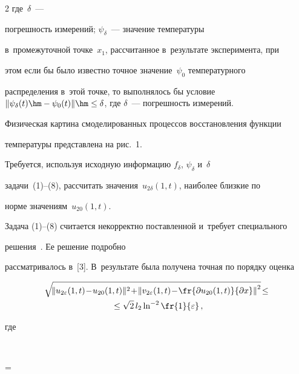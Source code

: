 \begin{multicols}{2}
где~$\delta$~--- 

погрешность измерений; $\psi_\delta$~--- значение температуры 

в~промежуточной точке~$x_1$, рассчитанное в~результате эксперимента, при 

этом если бы было известно точное значение~$\psi_0$ температурного 

распределения в~этой точке, то выполнялось бы условие $\| \psi_\delta(t)\hm- 

\psi_0(t)\| \hm\leq \delta$, где $\delta$~--- погрешность измерений.

  

  Физическая картина смоделированных процессов восстановления функции 

температуры пред\-став\-ле\-на на рис.~1.

  



  

  Требуется, используя исходную информацию $f_\delta$, $\psi_\delta$ и~$\delta$ 

задачи~(1)--(8), рассчитать значения~$u_{2\delta}(1,t)$, наиболее близкие по 

норме значениям~$u_{20}(1,t)$.

  

  Задача (1)--(8) считается некорректно по\-став\-лен\-ной и~требует специального 

решения~\cite{2-sr, 11-sr, 12-sr, 13-sr, 14-sr}. Ее решение подробно 

рассматривалось в~[3]. В~результате была получена точная по порядку оценка

 \begin{multline*}

  \!\sqrt{\!\| u_{2\varepsilon}(1,t)\!-\!u_{20}(1,t)\|^2\!+ \!\left \| 

  v_{2\varepsilon}(1,t)\!-\!

\fr{\partial u_{20}(1,t)}{\partial x}\right\|^2}\! \leq\\

{}\leq \sqrt{2}\,l_2\ln^{-

2}\fr{1}{\varepsilon}\,,

\end{multline*}

  где 

  $$

  \varepsilon= \,\delta \left[  \sqrt{2}\,r^{2/3}\left[ 

\fr{1+e^{-(x_1/\sqrt{2}}}{1-e^{-\sqrt{2}\,x_1}}\right] 


\end{multicols}
